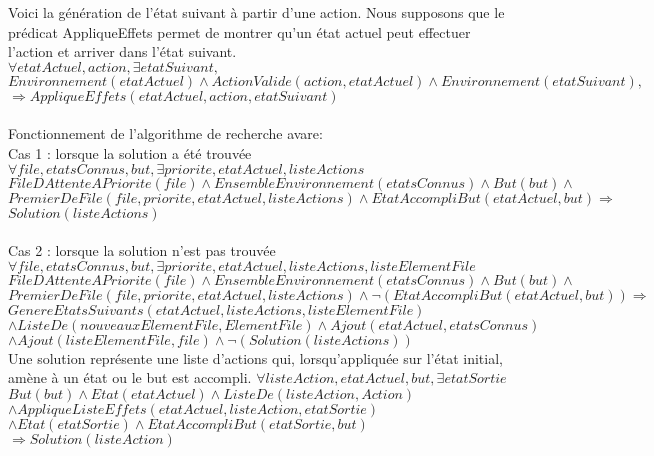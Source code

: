 \documentclass[12pt,letterpaper]{article}
\begin{document}
Voici la génération de l'état suivant à partir d'une action. Nous supposons que le prédicat AppliqueEffets permet de montrer qu'un état actuel peut effectuer l'action et arriver dans l'état suivant. \\
$ \forall etatActuel, action, \exists etatSuivant,  $ \\
$ Environnement(etatActuel) \wedge ActionValide(action, etatActuel) \wedge Environnement(etatSuivant), $ \\
$ \Rightarrow AppliqueEffets(etatActuel, action, etatSuivant) $ \\
\\

Fonctionnement de l'algorithme de recherche avare: \\
Cas 1 : lorsque la solution a été trouvée \\
$ \forall file, etatsConnus, but, \exists priorite, etatActuel, listeActions$ \\
$ FileDAttenteAPriorite(file) \wedge EnsembleEnvironnement(etatsConnus) \wedge But(but) \wedge  $ \\
$ PremierDeFile(file, priorite, etatActuel, listeActions) \wedge EtatAccompliBut(etatActuel, but)  \Rightarrow $ \\
$ Solution(listeActions)$ \\
\\
Cas 2 : lorsque la solution n'est pas trouvée \\
$ \forall file, etatsConnus, but, \exists priorite, etatActuel, listeActions, listeElementFile $ \\
$ FileDAttenteAPriorite(file) \wedge EnsembleEnvironnement(etatsConnus) \wedge But(but) \wedge  $ \\
$ PremierDeFile(file, priorite, etatActuel, listeActions) \wedge \neg (EtatAccompliBut(etatActuel, but))  \Rightarrow $ \\
$ GenereEtatsSuivants(etatActuel, listeActions, listeElementFile)  $ \\
$ \wedge ListeDe(nouveauxElementFile, ElementFile) \wedge Ajout(etatActuel, etatsConnus) $ \\
$ \wedge Ajout(listeElementFile, file) \wedge \neg (Solution(listeActions)) $ \\

Une solution représente une liste d'actions qui, lorsqu'appliquée sur l'état initial, amène à un état ou le but est accompli.
$ \forall listeAction, etatActuel, but, \exists etatSortie $ \\
$ But(but) \wedge Etat(etatActuel) \wedge ListeDe(listeAction, Action) $ \\
$ \wedge AppliqueListeEffets(etatActuel, listeAction, etatSortie) $ \\
$ \wedge Etat(etatSortie) \wedge EtatAccompliBut(etatSortie, but) $ \\
$ \Rightarrow Solution(listeAction) $ \\
\end{document}
